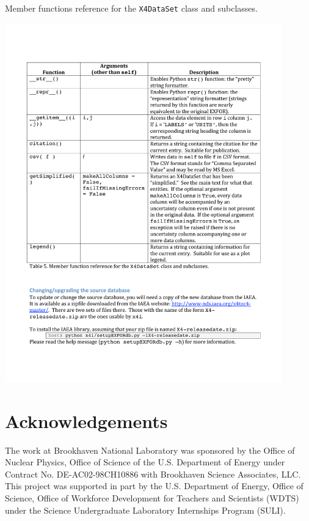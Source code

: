 \documentclass[11pt]{article}
\begin{document}
\begin{table}
\caption{Member functions reference for the \texttt{X4DataSet} class and subclasses.}
\begin{center}
\includegraphics[width=0.9\textwidth]{tables/table5}
\end{center}
\label{table:x4dataset}
\end{table}%

\section{Acknowledgements}
The work at Brookhaven National Laboratory was sponsored by the Office of Nuclear
Physics, Office of Science of the U.S. Department of Energy under Contract No.
DE-AC02-98CH10886 with Brookhaven Science Associates, LLC.
This project was supported in part by the U.S. Department of Energy, Office of Science,
Office of Workforce Development for Teachers and Scientists (WDTS) under the
Science Undergraduate Laboratory Internships Program (SULI).



\end{document}
